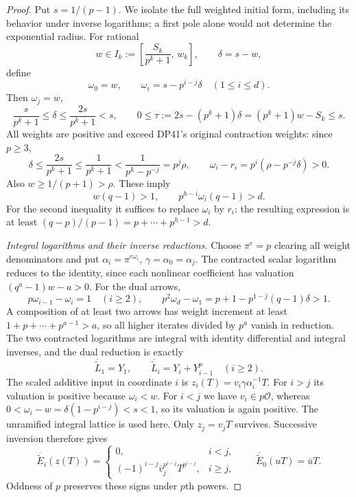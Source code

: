 \begin{proof}
Put $s=1/(p-1)$. We isolate the full weighted initial form, including its behavior under inverse logarithms; a first pole alone would not determine the exponential radius.
For rational
\[
 w\in I_k:=\left[\frac{S_k}{p^k+1},\,w_k\right],
 \qquad \delta=s-w,
\]
define
\[
 \omega_0=w,\qquad \omega_i=s-p^{i-j}\delta\quad(1\le i\le d).
\]
Then $\omega_j=w$,
\[
 \frac{s}{p^k+1}\le\delta\le\frac{2s}{p^k+1}<s,\qquad
 0\le\tau:=2s-(p^k+1)\delta=(p^k+1)w-S_k\le s.
\]
All weights are positive and exceed DP41's original contraction weights:
since $p\ge3$,
\[
 \delta\le\frac{2s}{p^k+1}\le\frac1{p^k+1}
 <\frac1{p^k-p^{-j}}=p^j\rho,
 \qquad \omega_i-r_i=p^i(\rho-p^{-j}\delta)>0.
\]
Also $w\ge1/(p+1)>\rho$. These imply
\begin{equation}\label{eq:pathstrict}
 w(q-1)>1,\qquad p^{h-i}\omega_i(q-1)>d.
\end{equation}
For the second inequality it suffices to replace $\omega_i$ by $r_i$:
the resulting expression is at least
$(q-p)/(p-1)=p+\cdots+p^{h-1}>d$.

\emph{Integral logarithms and their inverse reductions.}
Choose $\pi^e=p$ clearing all weight denominators and put
$\alpha_i=\pi^{e\omega_i}$, $\gamma=\alpha_0=\alpha_j$.
The contracted scalar logarithm reduces to the identity, since each nonlinear coefficient has valuation $(q^a-1)w-a>0$.
For the dual arrows,
\[
 p\omega_{i-1}-\omega_i=1\quad(i\ge2),\qquad
 p^2\omega_d-\omega_1
       =p+1-p^{1-j}(q-1)\delta>1.
\]
A composition of at least two arrows has weight increment at least
$1+p+\cdots+p^{a-1}>a$, so all higher iterates divided by $p^a$ vanish in reduction. The two contracted logarithms are integral with identity differential and integral inverses, and the dual reduction is exactly
\[
 \overline{\widetilde L}_1=Y_1,\qquad
 \overline{\widetilde L}_i=Y_i+Y_{i-1}^p\quad(i\ge2).
\]
The scaled additive input in coordinate $i$ is
$z_i(T)=v_i\gamma\alpha_i^{-1}T$.
For $i>j$ its valuation is positive because $\omega_i<w$.
For $i<j$ we have $v_i\in p\mathcal O$, whereas
$0<\omega_i-w=\delta(1-p^{i-j})<s<1$, so its valuation is again positive. The unramified integral lattice is used here. Only $z_j=v_jT$ survives. Successive inversion therefore gives
\begin{equation}\label{eq:pathinversereduction}
 \overline{\widetilde E}_i(z(T))=
 \begin{cases}
 0,&i<j,\\
 (-1)^{i-j}\bar v_j^{p^{i-j}}T^{p^{i-j}},&i\ge j,
 \end{cases}
 \qquad
 \overline{\widetilde E}_0(uT)=\bar uT.
\end{equation}
Oddness of $p$ preserves these signs under $p$th powers.


\end{proof}
